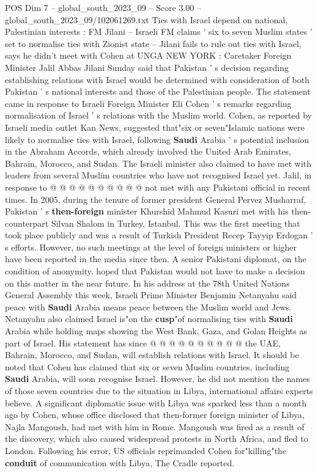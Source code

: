 \begin{textsample}{POS Dim 7 – global\_south\_2023\_09 – Score 3.00 – global\_south\_2023\_09/102061269.txt}  \label{ex:f7_pos_005}
Ties with Israel depend on national, Palestinian interests : FM Jilani -- Israeli FM claims ' six to seven Muslim states ' set to normalise ties with Zionist state -- Jilani fails to rule out ties with Israel, says he didn't meet with Cohen at UNGA NEW YORK : Caretaker Foreign Minister Jalil Abbas Jilani Sunday said that Pakistan ' s decision regarding establishing relations with Israel would be determined with consideration of both Pakistan ' s national interests and those of the Palestinian people.
The statement came in response to Israeli Foreign Minister Eli Cohen ' s remarks regarding normalisation of Israel ' s relations with the Muslim world.
Cohen, as reported by Israeli media outlet Kan News, suggested that"six or seven"Islamic nations were likely to normalise ties with Israel, following \textbf{Saudi} Arabia ' s potential inclusion in the Abraham Accords, which already involved the United Arab Emirates, Bahrain, Morocco, and Sudan.
The Israeli minister also claimed to have met with leaders from several Muslim countries who have not recognised Israel yet.
Jalil, in response to @ @ @ @ @ @ @ @ @ @ not met with any Pakistani official in recent times.
In 2005, during the tenure of former president General Pervez Musharraf, Pakistan ' s \textbf{then-foreign} minister Khurshid Mahmud Kasuri met with his then-counterpart Silvan Shalom in Turkey, Istanbul.
This was the first meeting that took place publicly and was a result of Turkish President Recep Tayyip Erdogan ' s efforts.
However, no such meetings at the level of foreign ministers or higher have been reported in the media since then.
A senior Pakistani diplomat, on the condition of anonymity, hoped that Pakistan would not have to make a decision on this matter in the near future.
In his address at the 78th United Nations General Assembly this week, Israeli Prime Minister Benjamin Netanyahu said peace with \textbf{Saudi} Arabia means peace between the Muslim world and Jews.
Netanyahu also claimed Israel is"on the \textbf{cusp}"of normalising ties with \textbf{Saudi} Arabia while holding maps showing the West Bank, Gaza, and Golan Heights as part of Israel.
His statement has since @ @ @ @ @ @ @ @ @ @ the UAE, Bahrain, Morocco, and Sudan, will establish relations with Israel.
It should be noted that Cohen has claimed that six or seven Muslim countries, including \textbf{Saudi} Arabia, will soon recognise Israel.
However, he did not mention the names of those seven countries due to the situation in Libya, international affairs experts believe.
A significant diplomatic issue with Libya was sparked less than a month ago by Cohen, whose office disclosed that then-former foreign minister of Libya, Najla Mangoush, had met with him in Rome.
Mangoush was fired as a result of the discovery, which also caused widespread protests in North Africa, and fled to London.
Following his error, US officials reprimanded Cohen for"killing"the \textbf{conduit} of communication with Libya, The Cradle reported.

\end{textsample}

